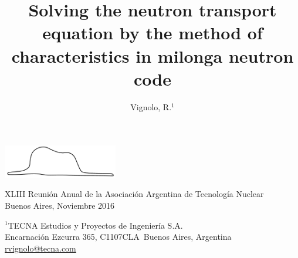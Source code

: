 \documentclass[11pt]{article}
\makeatletter
\def\affiliation#1{\def\@affiliation{#1}}
\def\maketitle{%
\thispagestyle{empty}

\null
\vspace{0.5cm plus 0.5cm minus 0.5cm}

\begin{center}
\begin{minipage}{0.8\linewidth}
\begin{center}
\Large{\textbf{\textsc{\@title}}}

\vspace{0.75cm plus 0.2cm minus 0.1cm}

\large{\@author}

\vspace{1.25cm plus 0.25cm minus 0.25cm}

\small{\@affiliation}
\vspace{1cm plus 0.2cm minus 0.2cm}

\end{center}
\end{minipage}
\end{center}

}
\makeatother
\begin{document}
\vfill

\begin{center}
\includegraphics[width=5cm]{vibora-blanca-sola.pdf}
\end{center}

\vfill

\begin{center}
\begin{small}
XLIII Reunión Anual de la Asociación Argentina de Tecnología Nuclear\\
Buenos Aires, Noviembre 2016
\end{small}
\end{center}

\pagebreak

\title{Solving the neutron transport equation by the method of characteristics in milonga neutron code}
\author{Vignolo, R.$^{1}$}
\affiliation{%
$^1$TECNA Estudios y Proyectos de Ingeniería S.A.\\
Encarnaci\'on Ezcurra 365, C1107CLA~Buenos Aires, Argentina\\
\url{rvignolo@tecna.com}\\
}


\maketitle
\end{document}
